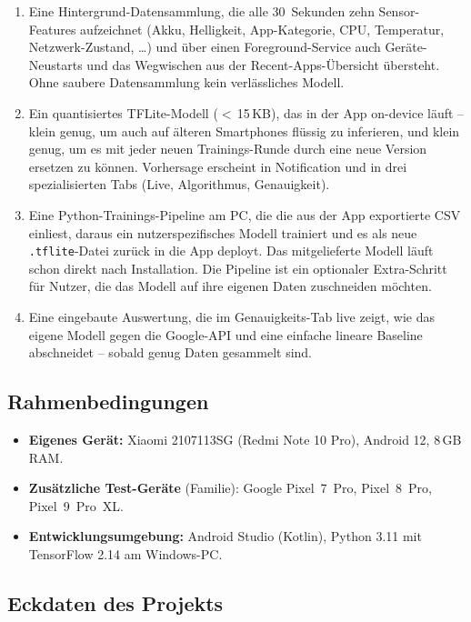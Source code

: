 \documentclass[12pt, a4paper, ngerman]{article}
\newcommand{\code}[1]{\texttt{#1}}
\begin{document}
\begin{enumerate}
\item Eine Hintergrund-Datensammlung, die alle 30~Sekunden zehn
  Sensor-Features aufzeichnet (Akku, Helligkeit, App-Kategorie,
  CPU, Temperatur, Netzwerk-Zustand, \ldots) und über einen
  Foreground-Service auch Geräte-Neustarts und das Wegwischen aus
  der Recent-Apps-Übersicht übersteht. Ohne saubere
  Datensammlung kein verlässliches Modell.
\item Ein quantisiertes TFLite-Modell ($<$\,15\,KB), das in der App
  on-device läuft -- klein genug, um auch auf älteren
  Smartphones flüssig zu inferieren, und klein genug, um es mit
  jeder neuen Trainings-Runde durch eine neue Version ersetzen
  zu können. Vorhersage erscheint in Notification und in drei
  spezialisierten Tabs (Live, Algorithmus, Genauigkeit).
\item Eine Python-Trainings-Pipeline am PC, die die aus der App
  exportierte CSV einliest, daraus ein nutzerspezifisches Modell
  trainiert und es als neue \code{.tflite}-Datei zurück in die
  App deployt. Das mitgelieferte Modell läuft schon direkt nach
  Installation. Die Pipeline ist ein optionaler Extra-Schritt für
  Nutzer, die das Modell auf ihre eigenen Daten zuschneiden
  möchten.
\item Eine eingebaute Auswertung, die im Genauigkeits-Tab live
  zeigt, wie das eigene Modell gegen die Google-API und eine
  einfache lineare Baseline abschneidet -- sobald genug Daten
  gesammelt sind.
\end{enumerate}

\subsection{Rahmenbedingungen}

\begin{itemize}
\item \textbf{Eigenes Gerät:} Xiaomi 2107113SG (Redmi Note 10 Pro),
  Android 12, 8\,GB RAM.
\item \textbf{Zusätzliche Test-Geräte} (Familie): Google
  Pixel~7~Pro, Pixel~8~Pro, Pixel~9~Pro~XL.
\item \textbf{Entwicklungsumgebung:} Android Studio (Kotlin),
  Python 3.11 mit TensorFlow 2.14 am Windows-PC.
\end{itemize}

\subsection{Eckdaten des Projekts}
\end{document}
